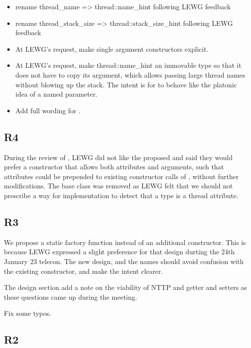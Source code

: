 \documentclass{wg21}
\begin{document}
\begin{itemize}
\item rename thread_name => thread::name_hint following LEWG feedback
\item rename thread_stack_size => thread::stack_size_hint following LEWG feedback
\item At LEWG's request, make single argument constructors explicit.
\item At LEWG's request, make thread::name_hint an immovable type so that it does not have to copy its argument, which allows passing large thread names without blowing up the stack.
      The intent is for  to behave like the platonic idea of a named parameter.
\item Add full wording for .
\end{itemize}

\subsection{R4}

During the review of , LEWG did not like the proposed  and said they would prefer a constructor
that allows both attributes and arguments, such that attributes could be prepended to existing constructor calls of , without further modifications.
The  base class was removed as LEWG felt that we should not prescribe a way for implementation to detect that a type is a thread attribute.

\subsection{R3}

We propose a  static factory function
instead of an additional constructor.
This is because LEWG expressed a slight preference for that design durting the 24th January 23 telecon.
The new design, and the names should avoid confusion with the existing constructor, and make the intent clearer.

The design section add a note on the viability of NTTP and getter and setters as these questions came up during the meeting.

Fix some typos.

\subsection{R2}
\end{document}
